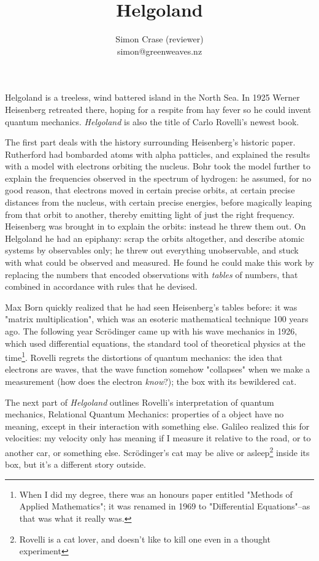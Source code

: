 \documentclass[]{article}
\title{Helgoland}
\author{Simon Crase (reviewer)\\simon@greenweaves.nz}
\begin{document}
	
\maketitle

Helgoland is a treeless, wind battered island in the North Sea. In 1925 Werner Heisenberg retreated there, hoping for a respite from hay fever so he could invent quantum mechanics. \emph{Helgoland} is also the title of Carlo Rovelli's newest book\cite{rovelli2020helgoland}.

The first part deals with the history surrounding Heisenberg's historic paper\cite{heisenberg1925quantum}. Rutherford had bombarded atoms with alpha patticles, and explained the results with a model with electrons orbiting the nucleus. Bohr took the model further to explain the frequencies observed in the spectrum of hydrogen: he assumed, for no good reason, that electrons moved in certain precise orbits, at certain precise distances from the nucleus, with certain precise energies, before magically leaping from that orbit to another, thereby emitting light of just the right frequency. Heisenberg was brought in to explain the orbits: instead he threw them out. On Helgoland he had an epiphany:  scrap the orbits altogether, and describe atomic systems by observables only; he threw out everything unobservable, and stuck with what could be observed and measured. He found he could make this work by replacing the numbers that encoded observations with \emph{tables} of numbers, that combined in accordance with rules that he devised.

Max Born quickly realized that he had seen Heisenberg's tables before: it was "matrix multiplication", which was an esoteric mathematical technique 100 years ago. The following year Scr\"odinger came up with his wave mechanics in 1926, which used differential equations, the standard tool of theoretical physics at the time\footnote{When I did my degree, there was an honours paper entitled "Methods of Applied Mathematics"; it was renamed in 1969 to "Differential Equations"--as that was what it really was.}. Rovelli regrets the distortions of quantum mechanics: the idea that electrons are waves, that the wave function somehow "collapses" when we make a measurement (how does the electron \emph{know}?); the box with its bewildered cat.

The next part of \emph{Helgoland} outlines Rovelli's interpretation of quantum mechanics, Relational Quantum Mechanics\cite{rovelli2018space}\cite{sep-qm-relational}: properties of a object have no meaning, except in their interaction with something else. Galileo realized this for velocities: my velocity only has meaning if I measure it relative to the road, or to another car, or something else. Scr\"odinger's cat may be alive or asleep\footnote{Rovelli is a cat lover, and doesn't like to kill one even in a thought experiment} inside its box, but it's a different story outside.
\end{document}
